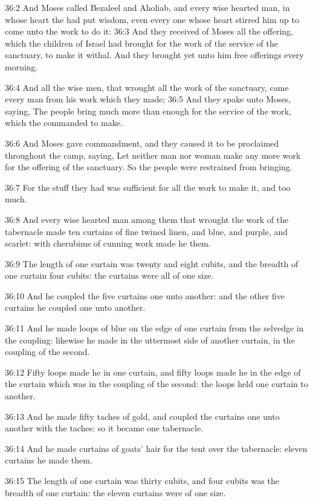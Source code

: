 36:2 And Moses called Bezaleel and Aholiab, and every wise hearted man, in whose heart the \LORD had put wisdom, even every one whose heart stirred him up to come unto the work to do it: 36:3 And they received of Moses all the offering, which the children of Israel had brought for the work of the service of the sanctuary, to make it withal. And they brought yet unto him free offerings every morning.

36:4 And all the wise men, that wrought all the work of the sanctuary, came every man from his work which they made; 36:5 And they spake unto Moses, saying, The people bring much more than enough for the service of the work, which the \LORD commanded to make.

36:6 And Moses gave commandment, and they caused it to be proclaimed throughout the camp, saying, Let neither man nor woman make any more work for the offering of the sanctuary. So the people were restrained from bringing.

36:7 For the stuff they had was sufficient for all the work to make it, and too much.

36:8 And every wise hearted man among them that wrought the work of the tabernacle made ten curtains of fine twined linen, and blue, and purple, and scarlet: with cherubims of cunning work made he them.

36:9 The length of one curtain was twenty and eight cubits, and the breadth of one curtain four cubits: the curtains were all of one size.

36:10 And he coupled the five curtains one unto another: and the other five curtains he coupled one unto another.

36:11 And he made loops of blue on the edge of one curtain from the selvedge in the coupling: likewise he made in the uttermost side of another curtain, in the coupling of the second.

36:12 Fifty loops made he in one curtain, and fifty loops made he in the edge of the curtain which was in the coupling of the second: the loops held one curtain to another.

36:13 And he made fifty taches of gold, and coupled the curtains one unto another with the taches: so it became one tabernacle.

36:14 And he made curtains of goats' hair for the tent over the tabernacle: eleven curtains he made them.

36:15 The length of one curtain was thirty cubits, and four cubits was the breadth of one curtain: the eleven curtains were of one size.

